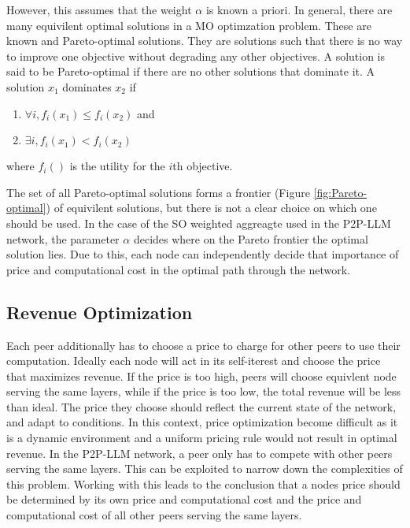 \documentclass[preprint,twoside,11pt]{article}
\begin{document}
However, this assumes that the weight $\alpha$ is known a priori. In general, there are many equivilent optimal solutions in a MO optimzation problem.
These are known and Pareto-optimal solutions. They are solutions such that there is no way to improve one objective without degrading any other objectives.
A solution is said to be Pareto-optimal if there are no other solutions that dominate it. A solution $x_1$ dominates $x_2$ if
\begin{enumerate}
	\item $\forall i, f_i(x_1) \leq f_i(x_2)$ and
	\item $\exists i, f_i(x_1) < f_i(x_2)$
\end{enumerate}
where $f_i()$ is the utility for the $i$th objective.

The set of all Pareto-optimal solutions forms a frontier (Figure \ref{fig:Pareto-optimal}) of equivilent solutions, but there is not a clear choice on which one should be used.
In the case of the SO weighted aggreagte used in the P2P-LLM network, the parameter $\alpha$ decides where on the Pareto frontier the optimal solution lies.
Due to this, each node can independently decide that importance of price and computational cost in the optimal path through the network.

\subsection{Revenue Optimization}

Each peer additionally has to choose a price to charge for other peers to use their computation.
Ideally each node will act in its self-iterest and choose the price that maximizes revenue.
If the price is too high, peers will choose equivlent node serving the same layers,
while if the price is too low, the total revenue will be less than ideal.
The price they choose should reflect the current state of the network, and adapt to conditions.
In this context, price optimization become difficult as it is a dynamic environment
and a uniform pricing rule would not result in optimal revenue.
In the P2P-LLM network, a peer only has to compete with other peers serving the same layers.
This can be exploited to narrow down the complexities of this problem.
Working with this leads to the conclusion that a nodes price should be determined
by its own price and computational cost and the price and computational cost of all other peers serving the same layers.
\end{document}
